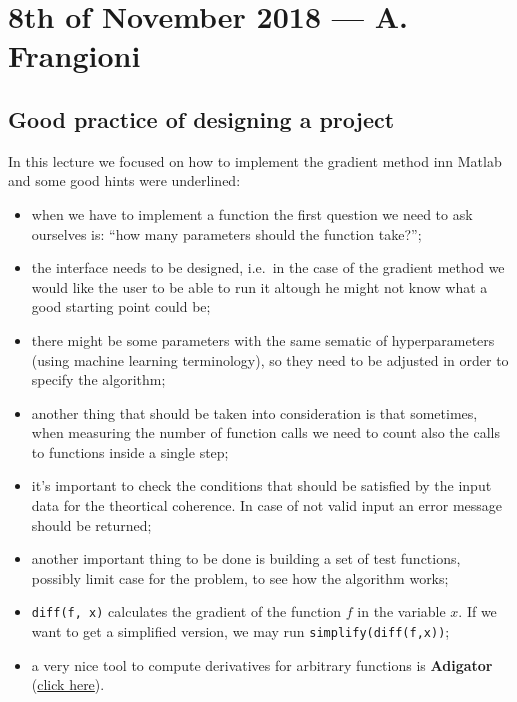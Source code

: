 \documentclass[ComputationalMathematics.tex]{subfiles}
\begin{document}
\section{8th of November 2018 --- A. Frangioni}

\subsection{Good practice of designing a project}
In this lecture we focused on how to implement the gradient method inn Matlab and some good hints were underlined:
\begin{itemize}
  \item when we have to implement a function the first question we need to ask ourselves is: ``how many parameters should the function take?'';
  \item the interface needs to be designed, i.e.~in the case of the gradient method we would like the user to be able to run it altough he might not know what a good starting point could be;
  \item there might be some parameters with the same sematic of hyperparameters (using machine learning terminology), so they need to be adjusted in order to specify the algorithm;
  \item another thing that should be taken into consideration is that sometimes, when measuring the number of function calls we need to count also the calls to functions inside a single step;
  \item it's important to check the conditions that should be satisfied by the input data for the theortical coherence. In case of not valid input an error message should be returned;
  \item another important thing to be done is building a set of test functions, possibly limit case for the problem, to see how the algorithm works;
  \item \texttt{diff(f, x)} calculates the gradient of the function $f$ in the variable $x$. If we want to get a simplified version, we may run \texttt{simplify(diff(f,x))};
  \item a very nice tool to compute derivatives for arbitrary functions is \textbf{Adigator} (\href{https://sourceforge.net/projects/adigator}{click here}). 
\end{itemize}
\end{document}
